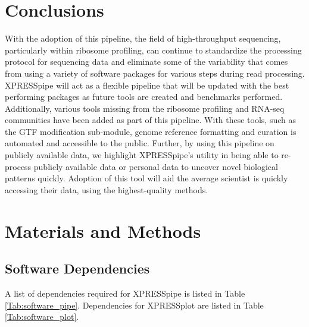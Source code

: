 \documentclass[11pt, a4paper, oneside]{article}
\begin{document}
\section{Conclusions}
With the adoption of this pipeline, the field of high-throughput sequencing, particularly within ribosome profiling, can continue to standardize the processing protocol for sequencing data and eliminate some of the variability that comes from using a variety of software packages for various steps during read processing. XPRESSpipe will act as a flexible pipeline that will be updated with the best performing packages as future tools are created and benchmarks performed. Additionally, various tools missing from the ribosome profiling and RNA-seq communities have been added as part of this pipeline. With these tools, such as the GTF modification sub-module, genome reference formatting and curation is automated and accessible to the public. Further, by using this pipeline on publicly available data, we highlight XPRESSpipe's utility in being able to re-process publicly available data or personal data to uncover novel biological patterns quickly. Adoption of this tool will aid the average scientist is quickly accessing their data, using the highest-quality methods.


\section{Materials and Methods}

\subsection{Software Dependencies}
A list of dependencies required for XPRESSpipe is listed in Table \ref{Tab:software_pipe}. Dependencies for XPRESSplot are listed in Table \ref{Tab:software_plot}.
\end{document}
